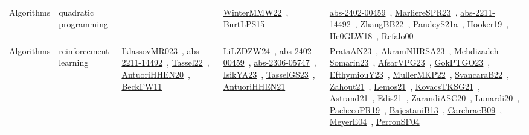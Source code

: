 {\begin{longtable}{lp{3cm}>{\raggedright\arraybackslash}p{6cm}>{\raggedright\arraybackslash}p{6cm}>{\raggedright\arraybackslash}p{8cm}}
\index{quadratic programming}\index{Algorithms!quadratic programming}Algorithms & quadratic programming &  & \href{../works/WinterMMW22.pdf}{WinterMMW22}~\cite{WinterMMW22}, \href{../works/BurtLPS15.pdf}{BurtLPS15}~\cite{BurtLPS15} & \href{../works/abs-2402-00459.pdf}{abs-2402-00459}~\cite{abs-2402-00459}, \href{../works/MarliereSPR23.pdf}{MarliereSPR23}~\cite{MarliereSPR23}, \href{../works/abs-2211-14492.pdf}{abs-2211-14492}~\cite{abs-2211-14492}, \href{../works/ZhangBB22.pdf}{ZhangBB22}~\cite{ZhangBB22}, \href{../works/PandeyS21a.pdf}{PandeyS21a}~\cite{PandeyS21a}, \href{../works/Hooker19.pdf}{Hooker19}~\cite{Hooker19}, \href{../works/He0GLW18.pdf}{He0GLW18}~\cite{He0GLW18}, \href{../works/Refalo00.pdf}{Refalo00}~\cite{Refalo00}\\
\index{reinforcement learning}\index{Algorithms!reinforcement learning}Algorithms & reinforcement learning & \href{../works/IklassovMR023.pdf}{IklassovMR023}~\cite{IklassovMR023}, \href{../works/abs-2211-14492.pdf}{abs-2211-14492}~\cite{abs-2211-14492}, \href{../works/Tassel22.pdf}{Tassel22}~\cite{Tassel22}, \href{../works/AntuoriHHEN20.pdf}{AntuoriHHEN20}~\cite{AntuoriHHEN20}, \href{../works/BeckFW11.pdf}{BeckFW11}~\cite{BeckFW11} & \href{../works/LiLZDZW24.pdf}{LiLZDZW24}~\cite{LiLZDZW24}, \href{../works/abs-2402-00459.pdf}{abs-2402-00459}~\cite{abs-2402-00459}, \href{../works/abs-2306-05747.pdf}{abs-2306-05747}~\cite{abs-2306-05747}, \href{../works/IsikYA23.pdf}{IsikYA23}~\cite{IsikYA23}, \href{../works/TasselGS23.pdf}{TasselGS23}~\cite{TasselGS23}, \href{../works/AntuoriHHEN21.pdf}{AntuoriHHEN21}~\cite{AntuoriHHEN21} & \href{../works/PrataAN23.pdf}{PrataAN23}~\cite{PrataAN23}, \href{../works/AkramNHRSA23.pdf}{AkramNHRSA23}~\cite{AkramNHRSA23}, \href{../works/Mehdizadeh-Somarin23.pdf}{Mehdizadeh-Somarin23}~\cite{Mehdizadeh-Somarin23}, \href{../works/AfsarVPG23.pdf}{AfsarVPG23}~\cite{AfsarVPG23}, \href{../works/GokPTGO23.pdf}{GokPTGO23}~\cite{GokPTGO23}, \href{../works/EfthymiouY23.pdf}{EfthymiouY23}~\cite{EfthymiouY23}, \href{../works/MullerMKP22.pdf}{MullerMKP22}~\cite{MullerMKP22}, \href{../works/SvancaraB22.pdf}{SvancaraB22}~\cite{SvancaraB22}, \href{../works/Zahout21.pdf}{Zahout21}~\cite{Zahout21}, \href{../works/Lemos21.pdf}{Lemos21}~\cite{Lemos21}, \href{../works/KovacsTKSG21.pdf}{KovacsTKSG21}~\cite{KovacsTKSG21}, \href{../works/Astrand21.pdf}{Astrand21}~\cite{Astrand21}, \href{../works/Edis21.pdf}{Edis21}~\cite{Edis21}, \href{../works/ZarandiASC20.pdf}{ZarandiASC20}~\cite{ZarandiASC20}, \href{../works/Lunardi20.pdf}{Lunardi20}~\cite{Lunardi20}, \href{../works/PachecoPR19.pdf}{PachecoPR19}~\cite{PachecoPR19}, \href{../works/BajestaniB13.pdf}{BajestaniB13}~\cite{BajestaniB13}, \href{../works/CarchraeB09.pdf}{CarchraeB09}~\cite{CarchraeB09}, \href{../works/MeyerE04.pdf}{MeyerE04}~\cite{MeyerE04}, \href{../works/PerronSF04.pdf}{PerronSF04}~\cite{PerronSF04}\\

\end{longtable}}

